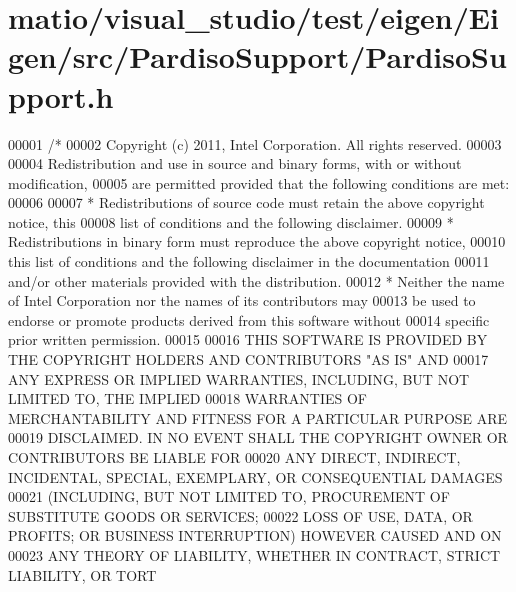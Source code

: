 \hypertarget{matio_2visual__studio_2test_2eigen_2_eigen_2src_2_pardiso_support_2_pardiso_support_8h_source}{}\section{matio/visual\+\_\+studio/test/eigen/\+Eigen/src/\+Pardiso\+Support/\+Pardiso\+Support.h}
\label{matio_2visual__studio_2test_2eigen_2_eigen_2src_2_pardiso_support_2_pardiso_support_8h_source}

\begin{DoxyCode}
00001 \textcolor{comment}{/*}
00002 \textcolor{comment}{ Copyright (c) 2011, Intel Corporation. All rights reserved.}
00003 \textcolor{comment}{}
00004 \textcolor{comment}{ Redistribution and use in source and binary forms, with or without modification,}
00005 \textcolor{comment}{ are permitted provided that the following conditions are met:}
00006 \textcolor{comment}{}
00007 \textcolor{comment}{ * Redistributions of source code must retain the above copyright notice, this}
00008 \textcolor{comment}{   list of conditions and the following disclaimer.}
00009 \textcolor{comment}{ * Redistributions in binary form must reproduce the above copyright notice,}
00010 \textcolor{comment}{   this list of conditions and the following disclaimer in the documentation}
00011 \textcolor{comment}{   and/or other materials provided with the distribution.}
00012 \textcolor{comment}{ * Neither the name of Intel Corporation nor the names of its contributors may}
00013 \textcolor{comment}{   be used to endorse or promote products derived from this software without}
00014 \textcolor{comment}{   specific prior written permission.}
00015 \textcolor{comment}{}
00016 \textcolor{comment}{ THIS SOFTWARE IS PROVIDED BY THE COPYRIGHT HOLDERS AND CONTRIBUTORS "AS IS" AND}
00017 \textcolor{comment}{ ANY EXPRESS OR IMPLIED WARRANTIES, INCLUDING, BUT NOT LIMITED TO, THE IMPLIED}
00018 \textcolor{comment}{ WARRANTIES OF MERCHANTABILITY AND FITNESS FOR A PARTICULAR PURPOSE ARE}
00019 \textcolor{comment}{ DISCLAIMED. IN NO EVENT SHALL THE COPYRIGHT OWNER OR CONTRIBUTORS BE LIABLE FOR}
00020 \textcolor{comment}{ ANY DIRECT, INDIRECT, INCIDENTAL, SPECIAL, EXEMPLARY, OR CONSEQUENTIAL DAMAGES}
00021 \textcolor{comment}{ (INCLUDING, BUT NOT LIMITED TO, PROCUREMENT OF SUBSTITUTE GOODS OR SERVICES;}
00022 \textcolor{comment}{ LOSS OF USE, DATA, OR PROFITS; OR BUSINESS INTERRUPTION) HOWEVER CAUSED AND ON}
00023 \textcolor{comment}{ ANY THEORY OF LIABILITY, WHETHER IN CONTRACT, STRICT LIABILITY, OR TORT}

\end{DoxyCode}
